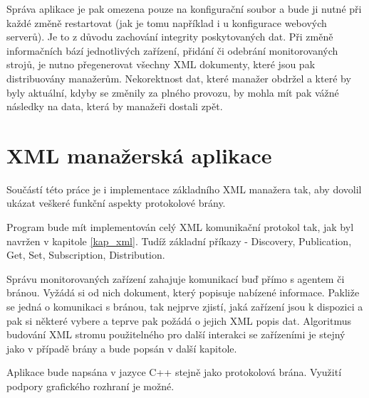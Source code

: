 Správa aplikace je pak omezena pouze na konfigurační soubor a bude ji nutné při každé změně restartovat (jak je tomu například i u konfigurace webových serverů). Je to z důvodu zachování integrity poskytovaných dat.
Při změně informačních bází jednotlivých zařízení, přidání či odebrání monitorovaných strojů, je nutno přegenerovat všechny XML dokumenty, které jsou pak distribuovány manažerům. Nekorektnost dat, které manažer obdržel a které
by byly aktuální, kdyby se změnily za plného provozu, by mohla mít pak vážné následky na data, která by manažeři dostali zpět.

\section{XML manažerská aplikace}
Součástí této práce je i implementace základního XML manažera tak, aby dovolil ukázat veškeré funkční aspekty protokolové brány.

Program bude mít implementován celý XML komunikační protokol tak, jak byl navržen v kapitole \ref{kap_xml}. Tudíž základní příkazy - Discovery, Publication, Get, Set, Subscription, Distribution.

Správu monitorovaných zařízení zahajuje komunikací buď přímo s agentem či bránou. Vyžádá si od nich 
dokument, který popisuje nabízené informace. Pakliže se jedná o komunikaci s bránou, tak nejprve zjistí, jaká zařízení jsou k dispozici a pak si některé vybere a teprve pak požádá o jejich XML popis dat.
Algoritmus budování XML stromu použitelného pro další interakci se zařízeními je stejný jako v případě brány a bude popsán v další kapitole. 

Aplikace bude napsána v jazyce C++ stejně jako protokolová brána. Využití podpory grafického rozhraní je možné.







